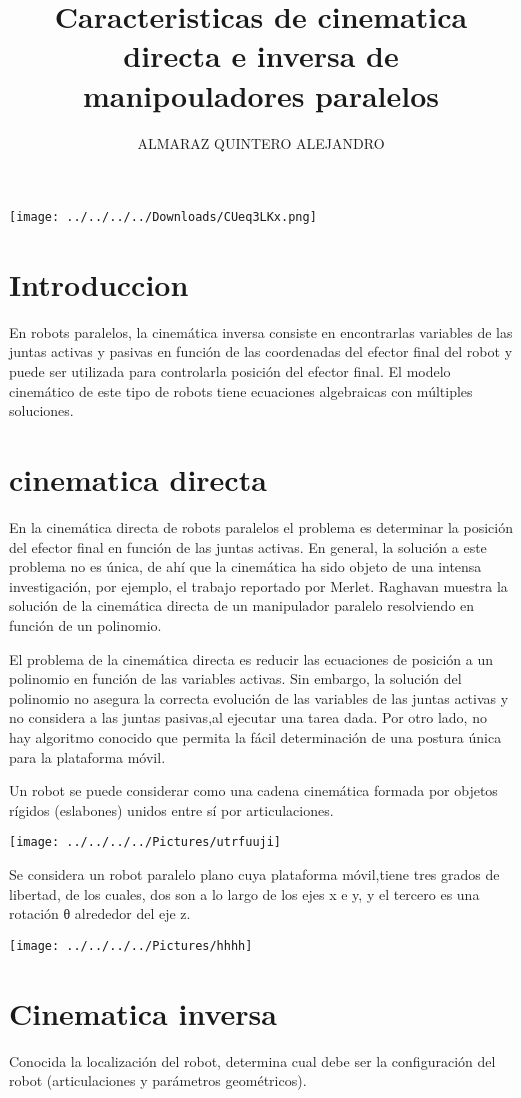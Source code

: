 \documentclass[12pt,a4paper]{article}
\author{ALMARAZ QUINTERO ALEJANDRO}
\title{Caracteristicas de cinematica directa e inversa de manipouladores paralelos}
\begin{document}
\maketitle
\texttt{[image: ../../../../Downloads/CUeq3LKx.png]} 

\clearpage

\section{Introduccion}
En robots paralelos, la cinemática inversa consiste en encontrarlas variables de las juntas activas y pasivas en función de las coordenadas del efector final del robot y puede ser utilizada para controlarla posición del efector final. El modelo cinemático de este tipo de robots tiene ecuaciones algebraicas con múltiples soluciones.
\section{cinematica directa}
En la cinemática directa de robots paralelos el problema es determinar la posición del efector final en función de las juntas activas. En general, la solución a este problema no es única, de ahí que la cinemática ha sido objeto de una intensa investigación, por ejemplo, el trabajo reportado por Merlet. Raghavan muestra la solución de la cinemática directa de un manipulador paralelo resolviendo en función de un polinomio.

El problema de la cinemática directa es reducir las ecuaciones de posición a un polinomio en función de las variables activas. Sin embargo, la solución del polinomio no asegura la correcta evolución de las variables de las juntas activas y no considera a las juntas pasivas,al ejecutar una tarea dada. Por otro lado, no hay algoritmo conocido que permita la fácil determinación de una postura única para la plataforma móvil.

Un robot se puede considerar como una cadena
cinemática formada por objetos rígidos (eslabones)
unidos entre sí por articulaciones.

\texttt{[image: ../../../../Pictures/utrfuuji]} 

Se considera un robot paralelo plano cuya plataforma móvil,tiene tres grados de libertad, de los cuales, dos son a lo largo de los ejes x e y, y el tercero es una rotación θ alrededor del eje z.

\texttt{[image: ../../../../Pictures/hhhh]} 

\section{Cinematica inversa}
Conocida la localización del robot, determina cual debe
ser la configuración del robot (articulaciones y
parámetros geométricos).
\end{document}

